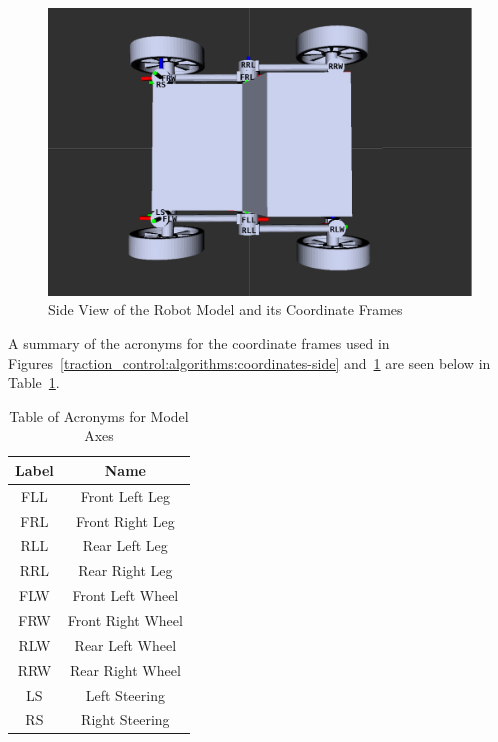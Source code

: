 \begin{figure}[H]
	\centering
	\includegraphics[scale=0.3]{sections/algorithms/images/srr_top.png}
	\caption{Side View of the Robot Model and its Coordinate Frames}
	\label{traction_control:algorithms:coordinates-top}
\end{figure}
 
A summary of the acronyms for the coordinate frames used in Figures~\ref{traction_control:algorithms:coordinates-side} and~\ref{traction_control:algorithms:coordinates-top} are seen below in Table~\ref{table:1}.
\begin{table}[H]
\begin{center}
	\begin{tabular}{|c|c|} 
		\hline    
		Label & Name \\
		\hline
		FLL & Front Left Leg \\
		FRL & Front Right Leg \\
		RLL & Rear Left Leg \\
		RRL & Rear Right Leg \\
		FLW & Front Left Wheel \\
		FRW & Front Right Wheel \\
		RLW & Rear Left Wheel \\
		RRW & Rear Right Wheel \\
		LS  & Left Steering \\ 
		RS  & Right Steering \\ 
	    \hline
	\end{tabular}
 	\caption{\label{table:1} Table of Acronyms for Model Axes}  	
\end{center}
\end{table}

